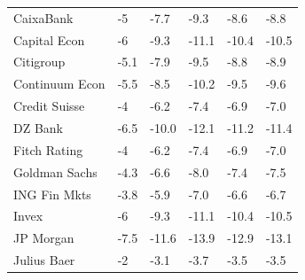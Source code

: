 \begin{table}[H]
{\begin{tabular}{l|l|llll}
CaixaBank                        & -5                          & -7.7                          & -9.3                         & -8.6                          & -8.8                            \\
Capital Econ                     & -6                          & -9.3                          & -11.1                        & -10.4                         & -10.5                           \\
Citigroup                        & -5.1                        & -7.9                          & -9.5                         & -8.8                          & -8.9                            \\
Continuum Econ                   & -5.5                        & -8.5                          & -10.2                        & -9.5                          & -9.6                            \\
Credit Suisse                    & -4                          & -6.2                          & -7.4                         & -6.9                          & -7.0                            \\
DZ Bank                          & -6.5                        & -10.0                          & -12.1                        & -11.2                         & -11.4                           \\
Fitch Rating                     & -4                          & -6.2                          & -7.4                         & -6.9                          & -7.0                            \\
Goldman Sachs                    & -4.3                        & -6.6                          & -8.0                         & -7.4                          & -7.5                            \\
ING Fin Mkts                     & -3.8                        & -5.9                          & -7.0                         & -6.6                          & -6.7                            \\
Invex                            & -6                          & -9.3                          & -11.1                        & -10.4                         & -10.5                           \\
JP Morgan                        & -7.5                        & -11.6                         & -13.9                        & -12.9                         & -13.1                           \\
Julius Baer                      & -2                          & -3.1                          & -3.7                         & -3.5                          & -3.5                            \\

\end{tabular}}
\end{table}
